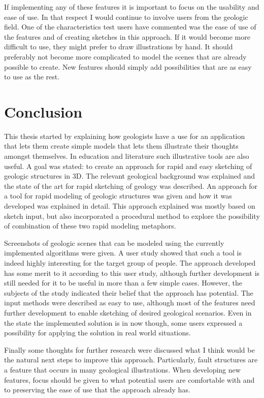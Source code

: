 \documentclass[a4paper,12pt]{report}
\begin{document}
If implementing any of these features it is important to focus on the usability and ease of use. In that respect I would continue to involve users from the geologic field. One of the characteristics test users have commented was the ease of use of the features and of creating sketches in this approach. If it would become more difficult to use, they might prefer to draw illustrations by hand. It should preferably not become more complicated to model the scenes that are already possible to create. New features should simply add possibilities that are as easy to use as the rest.

\clearpage
\chapter{Conclusion}
\label{sec:conclusion}
This thesis started by explaining how geologists have a use for an application that lets them create simple models that lets them illustrate their thoughts amongst themselves. In education and literature such illustrative tools are also useful. A goal was stated: to create an approach for rapid and easy sketching of geologic structures in 3D. The relevant geological background was explained and the state of the art for rapid sketching of geology was described. An approach for a tool for rapid modeling of geologic structures was given and how it was developed was explained in detail. This approach explained was mostly based on sketch input, but also incorporated a procedural method to explore the possibility of combination of these two rapid modeling metaphors.

Screenshots of geologic scenes that can be modeled using the currently implemented algorithms were given. A user study showed that such a tool is indeed highly interesting for the target group of people. The approach developed has some merit to it according to this user study, although further development is still needed for it to be useful in more than a few simple cases. However, the subjects of the study indicated their belief that the approach has potential. The input methods were described as easy to use, although most of the features need further development to enable sketching of desired geological scenarios. Even in the state the implemented solution is in now though, some users expressed a possibility for applying the solution in real world situations.

Finally some thoughts for further research were discussed what I think would be the natural next steps to improve this approach. Particularly, fault structures are a feature that occurs in many geological illustrations. When developing new features, focus should be given to what potential users are comfortable with and to preserving the ease of use that the approach already has.
\end{document}
